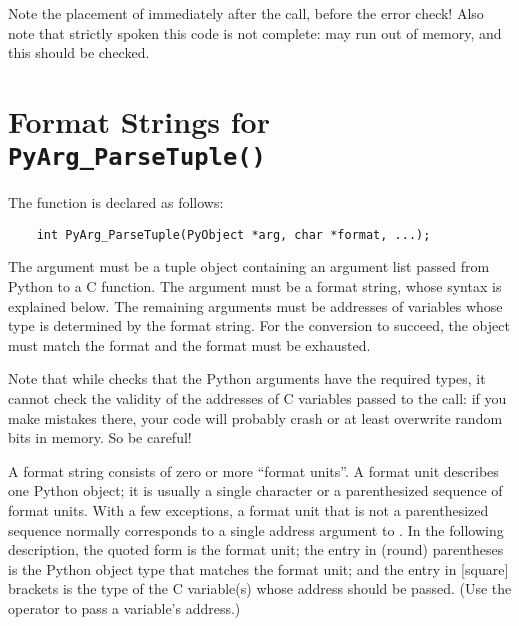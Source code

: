 Note the placement of  immediately after the call,
before the error check!  Also note that strictly spoken this code is
not complete:  may run out of memory, and this should
be checked.


\section{Format Strings for {\tt PyArg_ParseTuple()}}

The  function is declared as follows:

\begin{verbatim}
    int PyArg_ParseTuple(PyObject *arg, char *format, ...);
\end{verbatim}

The  argument must be a tuple object containing an argument
list passed from Python to a C function.  The  argument
must be a format string, whose syntax is explained below.  The
remaining arguments must be addresses of variables whose type is
determined by the format string.  For the conversion to succeed, the
 object must match the format and the format must be
exhausted.

Note that while  checks that the Python
arguments have the required types, it cannot check the validity of the
addresses of C variables passed to the call: if you make mistakes
there, your code will probably crash or at least overwrite random bits
in memory.  So be careful!

A format string consists of zero or more ``format units''.  A format
unit describes one Python object; it is usually a single character or
a parenthesized sequence of format units.  With a few exceptions, a
format unit that is not a parenthesized sequence normally corresponds
to a single address argument to .  In the
following description, the quoted form is the format unit; the entry
in (round) parentheses is the Python object type that matches the
format unit; and the entry in [square] brackets is the type of the C
variable(s) whose address should be passed.  (Use the \samp{\&}
operator to pass a variable's address.)

